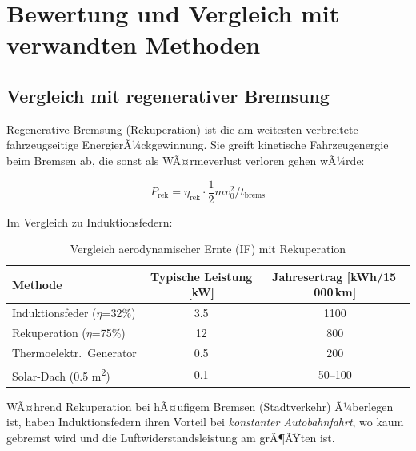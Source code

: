 ﻿\documentclass[12pt, a4paper]{report}
\theoremstyle{definition}
\theoremstyle{remark}
\begin{document}
\chapter{Bewertung und Vergleich mit verwandten Methoden}
\label{chap:vergleich}

\section{Vergleich mit regenerativer Bremsung}

Regenerative Bremsung (Rekuperation) ist die am weitesten verbreitete
fahrzeugseitige EnergierÃ¼ckgewinnung. Sie greift kinetische Fahrzeugenergie
beim Bremsen ab, die sonst als WÃ¤rmeverlust verloren gehen wÃ¼rde:

\begin{equation}
  P_{\text{rek}} = \eta_{\text{rek}} \cdot \frac{1}{2}mv_0^2 / t_{\text{brems}}
  \label{eq:p_rek}
\end{equation}

Im Vergleich zu Induktionsfedern:

\begin{table}[H]
  \centering
  \caption{Vergleich aerodynamischer Ernte (IF) mit Rekuperation}
  \label{tab:vergleich_rek}
  \begin{tabular}{lSS}
    \toprule
    Methode & {Typische Leistung [kW]} & {Jahresertrag [kWh/15\,000\,km]} \\
    \midrule
    Induktionsfeder ($\eta$=32\%) & 3.5 & 1100 \\
    Rekuperation ($\eta$=75\%)    & 12  & 800 \\
    Thermoelektr.\ Generator & 0.5 & 200 \\
    Solar-Dach (0.5 m\textsuperscript{2})      & 0.1 & {50--100} \\
    \bottomrule
  \end{tabular}
\end{table}

WÃ¤hrend Rekuperation bei hÃ¤ufigem Bremsen (Stadtverkehr) Ã¼berlegen ist,
haben Induktionsfedern ihren Vorteil bei \emph{konstanter Autobahnfahrt},
wo kaum gebremst wird und die Luftwiderstandsleistung am grÃ¶ÃŸten ist.
\end{document}
